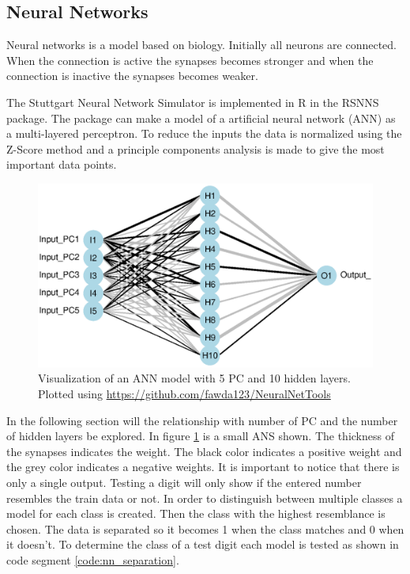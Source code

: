 \subsection{Neural Networks}

Neural networks is a model based on biology. 
Initially all neurons are connected. 
When the connection is active the synapses becomes stronger and when the connection is inactive the synapses becomes weaker.

The Stuttgart Neural Network Simulator is implemented in R in the RSNNS package.
The package can make a model of a artificial neural network (ANN) as a multi-layered perceptron.
To reduce the inputs the data is normalized using the Z-Score method and a principle components analysis is made to give the most important data points.

\begin{figure}[h]
    \includegraphics[width=\textwidth]{graphics/neural_network_visualized}
    \caption[Visualization of an ANN model.]{Visualization of an ANN model with 5 PC and 10 hidden layers. Plotted using \url{https://github.com/fawda123/NeuralNetTools}}
    \label{fig:neural_network_visualised}
\end{figure}

In the following section will the relationship with number of PC and the number of hidden layers be explored.
In figure \ref{fig:neural_network_visualised} is a small ANS shown.
The thickness of the synapses indicates the weight.
The black color indicates a positive weight and the grey color indicates a negative weights.
It is important to notice that there is only a single output. 
Testing a digit will only show if the entered number resembles the train data or not.
In order to distinguish between multiple classes a model for each class is created.
Then the class with the highest resemblance is chosen.
The data is separated so it becomes 1 when the class matches and 0 when it doesn't.
To determine the class of a test digit each model is tested as shown in code segment \ref{code:nn_separation}.

